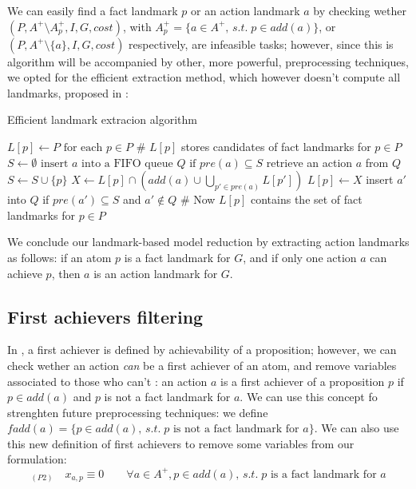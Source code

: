 We can easily find a fact landmark $p$ or an action landmark $a$ by checking wether $(P,A^+\setminus A^+_p,I,G,cost)$, with $A^+_p=\{a\in A^+,\,s.t.\;p\in add(a)\}$, or $(P,A^+\setminus \{a\},I,G,cost)$ respectively, are infeasible tasks; however, since this is algorithm will be accompanied by other, more powerful, preprocessing techniques, we opted for the efficient extraction method, which however doesn't compute all landmarks, proposed in \cite{Imai_15}:
\begin{algorithm}[h]
    \caption{Efficient landmark extracion algorithm}
    \begin{algorithmic}
        \State $L[p]\gets P\mbox{ for each } p\in P$ \qquad \# $L[p]$ stores candidates of fact landmarks for $p\in P$
        \State $S\gets\emptyset$
            \State $\mbox{insert }a\mbox{ into a FIFO queue }Q\mbox{ if }pre(a)\subseteq S$
        \EndFor
            \State retrieve an action $a$ from $Q$
                \State $S\gets S\cup\{p\}$
                \State $X\gets L[p]\cap(add(a)\cup\bigcup_{p'\in pre(a)}L[p'])$
                    \State $L[p]\gets X$
                    \State insert $a'$ into $Q$ if $pre(a')\subseteq S$ and $a'\not\in Q$
                    \EndFor
                \EndIf
            \EndFor
        \EndWhile
        \State \# Now $L[p]$ contains the set of fact landmarks for $p\in P$
    \end{algorithmic}
\end{algorithm}

We conclude our landmark-based model reduction by extracting action landmarks as follows: if an atom $p$ is a fact landmark for $G$, and if only one action $a$ can achieve $p$, then $a$ is an action landmark for $G$.

\subsection{First achievers filtering}
In \cite{LB_Haslum_12}, a first achiever is defined by achievability of a proposition; however, we can check wether an action \textit{can} be a first achiever of an atom, and remove variables associated to those who can't \cite{Imai_15}: an action $a$ is a first achiever of a proposition $p$ if $p\in add(a)$ and $p$ is not a fact landmark for $a$.
We can use this concept fo strenghten future preprocessing techniques: we define $fadd(a)=\{p\in add(a),\,s.t.\;p\mbox{ is not a fact landmark for }a\}$.
We can also use this new definition of first achievers to remove some variables from our formulation:
$$_{(P2)}\quad x_{a,p}\equiv0\qquad\forall a\in A^+,p\in add(a),\,s.t.\;p\mbox{ is a fact landmark for }a$$

